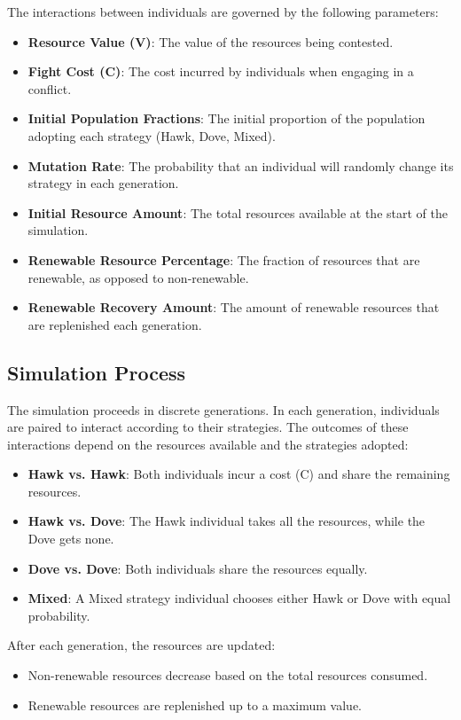 \documentclass{article}
\begin{document}
The interactions between individuals are governed by the following parameters:
\begin{itemize}
    \item \textbf{Resource Value (V)}: The value of the resources being contested.
    \item \textbf{Fight Cost (C)}: The cost incurred by individuals when engaging in a conflict.
    \item \textbf{Initial Population Fractions}: The initial proportion of the population adopting each strategy (Hawk, Dove, Mixed).
    \item \textbf{Mutation Rate}: The probability that an individual will randomly change its strategy in each generation.
    \item \textbf{Initial Resource Amount}: The total resources available at the start of the simulation.
    \item \textbf{Renewable Resource Percentage}: The fraction of resources that are renewable, as opposed to non-renewable.
    \item \textbf{Renewable Recovery Amount}: The amount of renewable resources that are replenished each generation.
\end{itemize}

\subsection{Simulation Process}
The simulation proceeds in discrete generations. In each generation, individuals are paired to interact according to their strategies. The outcomes of these interactions depend on the resources available and the strategies adopted:
\begin{itemize}
    \item \textbf{Hawk vs. Hawk}: Both individuals incur a cost (C) and share the remaining resources.
    \item \textbf{Hawk vs. Dove}: The Hawk individual takes all the resources, while the Dove gets none.
    \item \textbf{Dove vs. Dove}: Both individuals share the resources equally.
    \item \textbf{Mixed}: A Mixed strategy individual chooses either Hawk or Dove with equal probability.
\end{itemize}

After each generation, the resources are updated:
\begin{itemize}
    \item Non-renewable resources decrease based on the total resources consumed.
    \item Renewable resources are replenished up to a maximum value.
\end{itemize}
\end{document}
